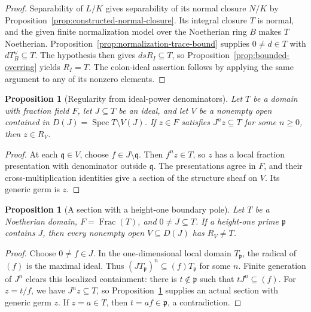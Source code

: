 \documentclass[11pt]{article}
\newtheorem{proposition}[theorem]{Proposition}
\theoremstyle{definition}
\theoremstyle{remark}
\DeclareMathOperator{\Spec}{Spec}
\DeclareMathOperator{\Frac}{Frac}
\begin{document}
\begin{proof}
Separability of \(L/K\) gives separability of its normal closure \(N/K\)
by Proposition~\ref{prop:constructed-normal-closure}.
Its integral closure \(T\) is normal, and the given finite normalization
model over the Noetherian ring \(B\) makes \(T\) Noetherian.
Proposition~\ref{prop:normalization-trace-bound} supplies
\(0\ne d\in T\) with \(dT^\vee_B\subseteq T\).
The hypothesis then gives \(dsR_I\subseteq T\), so
Proposition~\ref{prop:bounded-overring} yields \(R_I=T\).
The colon-ideal assertion follows by applying the same argument to any
of its nonzero elements.
\end{proof}

\begin{proposition}[Regularity from ideal-power denominators]
\label{prop:ideal-power-section}
Let \(T\) be a domain with fraction field \(F\), let \(J\subseteq T\)
be an ideal, and let \(V\) be a nonempty open contained in
\(D(J)=\Spec T\setminus V(J)\). If \(z\in F\) satisfies
\(J^n z\subseteq T\) for some \(n\ge0\), then \(z\in R_V\).
\end{proposition}

\begin{proof}
At each \(\mathfrak q\in V\), choose \(f\in J\setminus\mathfrak q\).
Then \(f^n z\in T\), so \(z\) has a local fraction presentation with
denominator outside \(\mathfrak q\). The presentations agree in \(F\),
and their cross-multiplication identities give a section of the structure
sheaf on \(V\). Its generic germ is \(z\).
\end{proof}

\begin{proposition}[A section with a height-one boundary pole]
\label{prop:height-one-boundary-pole}
Let \(T\) be a Noetherian domain, \(F=\Frac(T)\), and \(0\ne J\subseteq T\).
If a height-one prime \(\mathfrak p\) contains \(J\), then every nonempty
open \(V\subseteq D(J)\) has \(R_V\ne T\).
\end{proposition}

\begin{proof}
Choose \(0\ne f\in J\). In the one-dimensional local domain
\(T_{\mathfrak p}\), the radical of \((f)\) is the maximal ideal.
Thus \((JT_{\mathfrak p})^n\subseteq(f)T_{\mathfrak p}\) for some \(n\).
Finite generation of \(J^n\) clears this localized containment: there is
\(t\notin\mathfrak p\) such that \(tJ^n\subseteq(f)\).
For \(z=t/f\), we have \(J^n z\subseteq T\), so
Proposition~\ref{prop:ideal-power-section} supplies an actual section with
generic germ \(z\). If \(z=a\in T\), then \(t=af\in\mathfrak p\),
a contradiction.
\end{proof}
\end{document}
